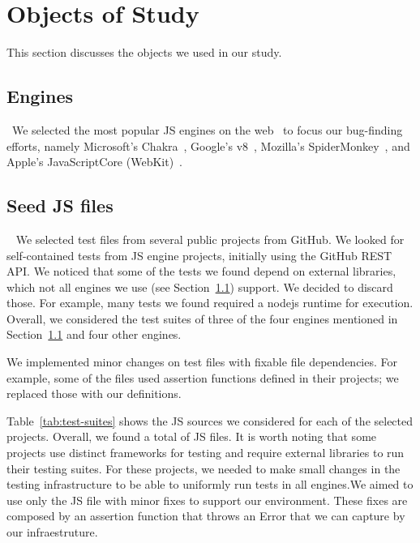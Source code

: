 \documentclass[10pt,conference,anonymous]{IEEEtran}
\begin{document}
\section{Objects of Study}
\label{sec:methodology}

This section discusses the objects we used in our study.

\subsection{Engines}
\label{sec:methodology:engines}~We selected the most popular JS
engines on the web~ to focus our bug-finding efforts, namely
Microsoft's Chakra~\cite{chakra2018repo}, Google's
v8~\cite{v82018repo}, Mozilla's
SpiderMonkey~\cite{spidermonkey2018repo}, and Apple's JavaScriptCore
(WebKit)~\cite{jsc2018repo}.

\subsection{Seed JS files\label{sec:seeds}}~
We selected test files from several public projects from GitHub. We
looked for self-contained tests from JS engine projects, initially
using the GitHub REST API. We noticed that some of the tests
we found depend on external libraries, which not all engines we use
(see Section~\ref{sec:methodology:engines}) support. We decided to
discard those. For example, many tests we found required a
nodejs runtime for execution. Overall, we considered the
test suites of three of the four engines mentioned in
Section~\ref{sec:methodology:engines} and four other engines.

We
implemented minor changes on test files with fixable file dependencies. For
example, some of the files used assertion functions defined in their
projects; we replaced those with our definitions.

Table~\ref{tab:test-suites} shows the JS sources we considered for
each of the selected projects. Overall, we found a total of
\totfiles{} JS files. It is worth noting that some projects use
distinct frameworks for testing and require external libraries to run
their testing suites. For these projects, we needed to make small
changes in the testing infrastructure to be able to uniformly run
tests in all engines.We aimed to use only the JS file with minor fixes to
support our environment. These fixes are composed by an assertion
function that throws an Error that we can capture by our
infraestruture.
\end{document}
